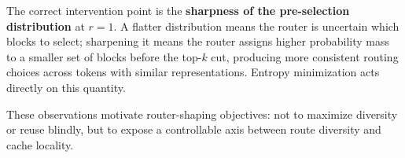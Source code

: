 The correct intervention point is the \textbf{sharpness of the pre-selection distribution}
at $r = 1$.
A flatter distribution means the router is uncertain which blocks to select; sharpening it
means the router assigns higher probability mass to a smaller set of blocks before the
top-$k$ cut, producing more consistent routing choices across tokens with similar
representations.
Entropy minimization acts directly on this quantity.

These observations motivate router-shaping objectives: not to maximize diversity or reuse
blindly, but to expose a controllable axis between route diversity and cache locality.
